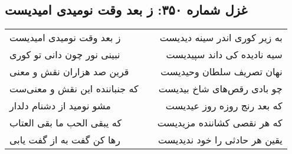 \begin{center}
\section*{غزل شماره ۳۵۰: ز بعد وقت نومیدی امیدیست}
\label{sec:0350}
\begin{longtable}{l p{0.5cm} r}
ز بعد وقت نومیدی امیدیست
&&
به زیر کوری اندر سینه دیدیست
\\
نبینی نور چون دانی تو کوری
&&
سیه نادیده کی داند سپیدیست
\\
قرین صد هزاران نقش و معنی
&&
نهان تصریف سلطان وحیدیست
\\
که جنباننده این نقش و معنی‌ست
&&
چو بادی رقص‌های شاخ بیدیست
\\
مشو نومید از دشنام دلدار
&&
که بعد رنج روزه روز عیدیست
\\
که یبقی الحب ما بقی العتاب
&&
که هر نقصی کشاننده مزیدیست
\\
رها کن گفت به از گفت یابی
&&
یقین هر حادثی را خود ندیدیست
\\
\end{longtable}
\end{center}
